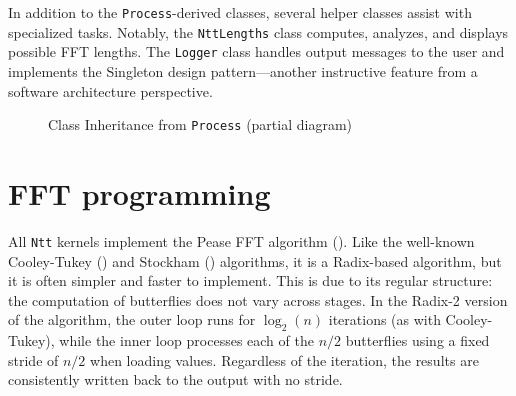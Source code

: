 \documentclass{article}
\begin{document}
In addition to the \texttt{Process}-derived classes, several helper classes assist with specialized tasks. Notably, the \texttt{NttLengths} class computes, analyzes, and displays possible FFT lengths. The \texttt{Logger} class handles output messages to the user and implements the Singleton design pattern—another instructive feature from a software architecture perspective.

\begin{figure}
\caption{Class Inheritance from \texttt{Process} (partial diagram)}
\label{fig:ProcessHierarchy}
\end{figure}

\section{FFT programming}

All \texttt{Ntt} kernels implement the Pease FFT algorithm (\cite{Pea68}). Like the well-known Cooley-Tukey (\cite{CT65}) and Stockham (\cite{Sto66}) algorithms, it is a Radix-based algorithm, but it is often simpler and faster to implement. This is due to its regular structure: the computation of butterflies does not vary across stages. In the Radix-2 version of the algorithm, the outer loop runs for $\log_2(n)$ iterations (as with Cooley-Tukey), while the inner loop processes each of the $n/2$ butterflies using a fixed stride of $n/2$ when loading values. Regardless of the iteration, the results are consistently written back to the output with no stride.
\end{document}
